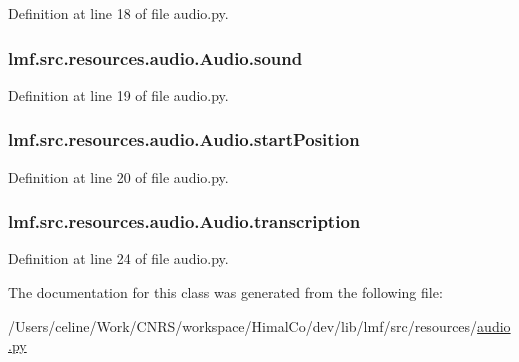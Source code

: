 Definition at line 18 of file audio.\+py.

\hypertarget{classlmf_1_1src_1_1resources_1_1audio_1_1_audio_a18d7a7940c8b55db6dbcbe64559cf68c}{
\subsubsection[{sound}]{\setlength{\rightskip}{0pt plus 5cm}lmf.\+src.\+resources.\+audio.\+Audio.\+sound}}\label{classlmf_1_1src_1_1resources_1_1audio_1_1_audio_a18d7a7940c8b55db6dbcbe64559cf68c}


Definition at line 19 of file audio.\+py.

\hypertarget{classlmf_1_1src_1_1resources_1_1audio_1_1_audio_a5ff81f6d9d1f1d078a067f73594758f4}{
\subsubsection[{start\+Position}]{\setlength{\rightskip}{0pt plus 5cm}lmf.\+src.\+resources.\+audio.\+Audio.\+start\+Position}}\label{classlmf_1_1src_1_1resources_1_1audio_1_1_audio_a5ff81f6d9d1f1d078a067f73594758f4}


Definition at line 20 of file audio.\+py.

\hypertarget{classlmf_1_1src_1_1resources_1_1audio_1_1_audio_ab8d1f2cfa0f42732f123177df3b56849}{
\subsubsection[{transcription}]{\setlength{\rightskip}{0pt plus 5cm}lmf.\+src.\+resources.\+audio.\+Audio.\+transcription}}\label{classlmf_1_1src_1_1resources_1_1audio_1_1_audio_ab8d1f2cfa0f42732f123177df3b56849}


Definition at line 24 of file audio.\+py.



The documentation for this class was generated from the following file\+:\begin{DoxyCompactItemize}
\item 
/\+Users/celine/\+Work/\+C\+N\+R\+S/workspace/\+Himal\+Co/dev/lib/lmf/src/resources/\hyperlink{audio_8py}{audio.\+py}\end{DoxyCompactItemize}
